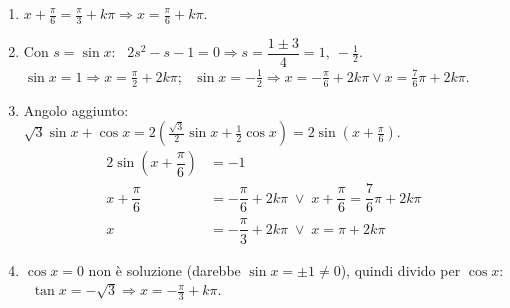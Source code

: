 \begin{question}[ID=4.2, subtitle={Equazioni goniometriche con duplicazione — serie 2}, tags={goniometria, equazioni goniometriche}, difficulty=media]
\begin{explanation}
\begin{enumerate}
\[\begin{aligned}
    2x &= \pi+2k\pi \;\vee\; 2x=-\dfrac\pi3+2k\pi && \textcolor{gray}{\text{sommo $\dfrac\pi3$}}\\
    x &= \dfrac\pi2+k\pi \;\vee\; x=-\dfrac\pi6+k\pi
    \end{aligned}\]
    \item $x+\tfrac\pi6=\tfrac\pi3+k\pi \Rightarrow x=\tfrac\pi6+k\pi$.
    \item Con $s=\sin x$: \ $2s^2-s-1=0 \Rightarrow s=\dfrac{1\pm3}{4}=1,\ -\tfrac12$. \\
    $\sin x=1 \Rightarrow x=\tfrac\pi2+2k\pi$; \ $\sin x=-\tfrac12 \Rightarrow x=-\tfrac\pi6+2k\pi \vee x=\tfrac76\pi+2k\pi$.
    \item Angolo aggiunto: $\sqrt3\sin x+\cos x=2\left(\tfrac{\sqrt3}{2}\sin x+\tfrac12\cos x\right)=2\sin\left(x+\tfrac\pi6\right)$.
    \[\begin{aligned}
    2\sin\left(x+\dfrac\pi6\right) &= -1\\
    x+\dfrac\pi6 &= -\dfrac\pi6+2k\pi \;\vee\; x+\dfrac\pi6=\dfrac76\pi+2k\pi\\
    x &= -\dfrac\pi3+2k\pi \;\vee\; x=\pi+2k\pi
    \end{aligned}\]
    \item $\cos x=0$ non è soluzione (darebbe $\sin x=\pm1\neq0$), quindi divido per $\cos x$: \ $\tan x=-\sqrt3 \Rightarrow x=-\tfrac\pi3+k\pi$.
\end{enumerate}
\end{explanation}
\end{question}


